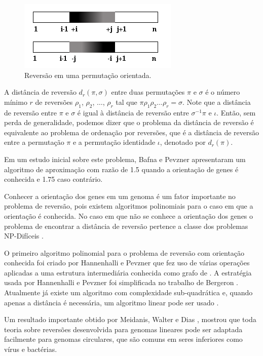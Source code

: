 \begin{figure}
  \centering
  \includegraphics{images/rev_orientada.png}
  \caption{Reversão em uma permutação orientada.}
  \label{fig:rev_orientada}
\end{figure}

A distância de reversão $d_{r}(\pi,\sigma)$ entre duas permutações
$\pi$ e $\sigma$ é o número mínimo $r$ de reversões $\rho_{1}$,
$\rho_{2}$, $\ldots$, $\rho_{r}$ tal que
$\pi \rho_{1} \rho_{2} \ldots \rho_{r} = \sigma$. Note que a distância
de reversão entre $\pi$ e $\sigma$ é igual à distância de reversão
entre $\sigma^{-1} \pi$ e $\iota$. Então, sem perda de generalidade,
podemos dizer que o problema da distância de reversão é equivalente ao
problema de ordenação por reversões, que é a distância de reversão
entre a permutação $\pi$ e a permutação identidade $\iota$, denotado
por $d_{r}(\pi)$.

Em um estudo inicial sobre este problema, Bafna e
Pevzner \cite{BafnaPevzner*1996} apresentaram um algoritmo de
aproximação com razão de 1.5 quando a orientação de genes é conhecida
e 1.75 caso contrário.

Conhecer a orientação dos genes em um genoma é um fator importante no
problema de reversão, pois existem algoritmos polinomiais para o caso
em que a orientação é conhecida. No caso em que não se conhece a
orientação dos genes o problema de encontrar a distância de reversão
pertence a classe dos problemas NP-Difíceis \cite{Caprara*1997}.

O primeiro algoritmo polinomial para o problema de reversão com
orientação conhecida foi criado por Hannenhalli e Pevzner
\cite{HannenhalliPevzner*1995} que fez uso de várias operações
aplicadas a uma estrutura intermediária conhecida como grafo
de \bkp{}. A estratégia usada por Hannenhalli e Pevzner foi
simplificada no trabalho de Bergeron \cite{Bergeron*2005}. Atualmente
já existe um algoritmo com complexidade sub-quadrática
\cite{TannierSagot*2004} e, quando apenas a distância é necessária, um
algoritmo linear pode ser usado \cite{BaderMoretYan*2001}.

Um resultado importante obtido por Meidanis, Walter e Dias
\cite{MeidanisWalterDias*2000}, mostrou que toda teoria sobre
reversões desenvolvida para genomas lineares pode ser adaptada
facilmente para genomas circulares, que são comuns em seres inferiores
como vírus e bactérias.

